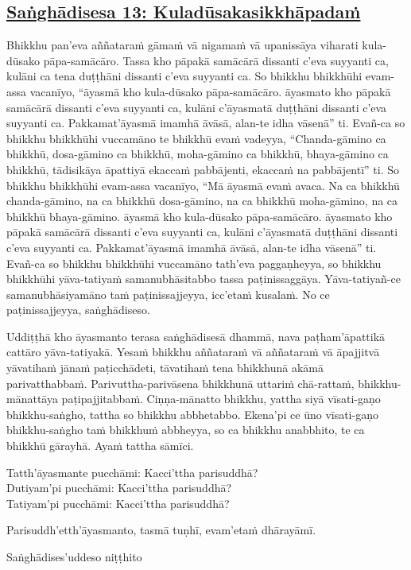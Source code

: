 \subsection*{\hyperref[comm13]{Saṅghādisesa 13: Kuladūsakasikkhāpadaṁ}}
\label{sd13}
Bhikkhu pan'eva aññataraṁ gāmaṁ vā nigamaṁ vā upanissāya viharati kula-dūsako pāpa-samācāro. Tassa kho pāpakā samācārā dissanti c'eva suyyanti ca, kulāni ca tena duṭṭhāni dissanti c'eva suyyanti ca. So bhikkhu bhikkhūhi evam-assa vacanīyo, “āyasmā kho kula-dūsako pāpa-samācāro. āyasmato kho pāpakā samācārā dissanti c'eva suyyanti ca, kulāni c'āyasmatā duṭṭhāni dissanti c'eva suyyanti ca. Pakkamat'āyasmā imamhā āvāsā, alan-te idha vāsenā” ti. Evañ-ca so bhikkhu bhikkhūhi vuccamāno te bhikkhū evaṁ vadeyya, “Chanda-gāmino ca bhikkhū, dosa-gāmino ca bhikkhū, moha-gāmino ca bhikkhū, bhaya-gāmino ca bhikkhū, tādisikāya āpattiyā ekaccaṁ pabbājenti, ekaccaṁ na pabbājentī” ti. So bhikkhu bhikkhūhi evam-assa vacanīyo, “Mā āyasmā evaṁ avaca. Na ca bhikkhū chanda-gāmino, na ca bhikkhū dosa-gāmino, na ca bhikkhū moha-gāmino, na ca bhikkhū bhaya-gāmino. āyasmā kho kula-dūsako pāpa-samācāro. āyasmato kho pāpakā samācārā dissanti c'eva suyyanti ca, kulāni c'āyasmatā duṭṭhāni dissanti c'eva suyyanti ca. Pakkamat'āyasmā imamhā āvāsā, alan-te idha vāsenā” ti. Evañ-ca so bhikkhu bhikkhūhi vuccamāno tath'eva paggaṇheyya, so bhikkhu bhikkhūhi yāva-tatiyaṁ samanubhāsitabbo tassa paṭinissaggāya. Yāva-tatiyañ-ce samanubhāsiyamāno taṁ paṭinissajjeyya, icc'etaṁ kusalaṁ. No ce paṭinissajjeyya, saṅghādiseso.

\medskip

\begin{center}
Uddiṭṭhā kho āyasmanto terasa saṅghādisesā dhammā, nava paṭham'āpattikā cattāro yāva-tatiyakā. Yesaṁ bhikkhu aññataraṁ vā aññataraṁ vā āpajjitvā yāvatihaṁ jānaṁ paṭicchādeti, tāvatihaṁ tena bhikkhunā akāmā parivatthabbaṁ. Parivuttha-parivāsena bhikkhunā uttariṁ chā-rattaṁ, bhikkhu-mānattāya paṭipajjitabbaṁ. Ciṇṇa-mānatto bhikkhu, yattha siyā vīsati-gaṇo bhikkhu-saṅgho, tattha so bhikkhu abbhetabbo. Ekena'pi ce ūno vīsati-gaṇo bhikkhu-saṅgho taṁ bhikkhuṁ abbheyya, so ca bhikkhu anabbhito, te ca bhikkhū gārayhā. Ayaṁ tattha sāmīci.

\smallskip

Tatth'āyasmante pucchāmi: Kacci'ttha parisuddhā?\\
Dutiyam'pi pucchāmi: Kacci'ttha parisuddhā?\\
Tatiyam'pi pucchāmi: Kacci'ttha parisuddhā?

\smallskip

Parisuddh'etth'āyasmanto, tasmā tuṇhī, evam'etaṁ dhārayāmī.
\end{center}

\begin{outro}
  Saṅghādises'uddeso niṭṭhito
\end{outro}

\clearpage
